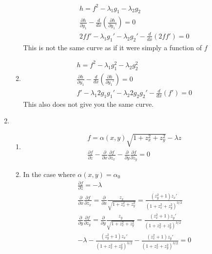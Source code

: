 \documentclass[12pt]{article}
\newcommand{\p}[2]{\frac{\partial #1}{\partial #2}}
\begin{document}
\begin{enumerate}
\begin{enumerate}
            \begin{gather*}
                h=f^2-\lambda_1 g_1-\lambda_2 g_2\\
                \frac{\partial h}{\partial y_1}-\frac{d}{dx}\left(\frac{\partial h}{\partial y_1'}\right)=0\\
                2ff'-\lambda_1 g_1'-\lambda_2 g_2'-\frac{d}{dx}\left(2ff'\right)=0
            \end{gather*}
            This is not the same curve as if it were simply a function of $f$
            \item
            \begin{gather*}
                h=f^2-\lambda_1 g_1^2-\lambda_2 g_2^2\\
                \frac{\partial h}{\partial y_1}-\frac{d}{dx}\left(\frac{\partial h}{\partial y_1'}\right)=0\\
                f'-\lambda_1 2g_1 g_1'-\lambda_2 2g_2 g_2'-\frac{d}{dx}\left(f'\right)=0
            \end{gather*}
            This also does not give you the same curve.
        \end{enumerate}
        \item
        \begin{enumerate}
            \item
            \begin{gather*}
                f=\alpha(x,y)\sqrt{1+z_x^2+z_y^2}-\lambda z\\
                \frac{\partial f}{\partial z}-\frac{\partial}{\partial x}\frac{\partial f}{\partial z_x}-\frac{\partial}{\partial y}\frac{\partial f}{\partial z_y}=0
            \end{gather*}
            \item
            In the case where $\alpha(x,y)=\alpha_0$
            \begin{gather*}
                \frac{\partial f}{\partial z}=-\lambda\\
                \frac{\partial}{\partial x}\frac{\partial f}{\partial z_x}=\p{}{x}\frac{z_x}{\sqrt{1+z_x^2+z_y^2}}=\frac{(z_y^2+1)z_x'}{\left( 1+z_x^2+z_y^2 \right)^{3/2}}\\
                \frac{\partial}{\partial y}\frac{\partial f}{\partial z_y}=\p{}{y}\frac{z_y}{\sqrt{1+z_x^2+z_y^2}}=\frac{(z_x^2+1)z_y'}{\left( 1+z_x^2+z_y^2 \right)^{3/2}}\\
                -\lambda-\frac{(z_y^2+1)z_x'}{\left( 1+z_x^2+z_y^2 \right)^{3/2}}-\frac{(z_x^2+1)z_y'}{\left( 1+z_x^2+z_y^2 \right)^{3/2}}=0

\end{gather*}
\end{enumerate}
\end{enumerate}
\end{document}
